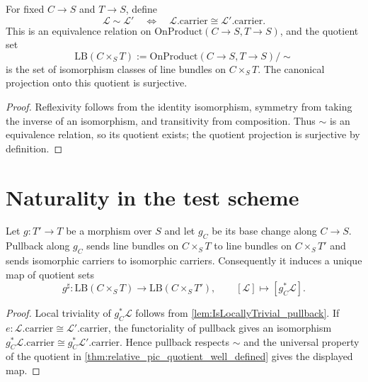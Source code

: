 \begin{theorem}\leanok
  \label{thm:relative_pic_quotient_well_defined}
  For fixed $C\to S$ and $T\to S$, define
  \[
    \mathcal L\sim\mathcal L'
      \quad\Longleftrightarrow\quad
      \mathcal L.\mathrm{carrier}\cong\mathcal L'.\mathrm{carrier}.
  \]
  This is an equivalence relation on
  $\mathrm{OnProduct}(C\to S,T\to S)$, and the quotient set
  \[
    \mathrm{LB}(C\times_S T):=
    \mathrm{OnProduct}(C\to S,T\to S)/\!\sim
  \]
  is the set of isomorphism classes of line bundles on $C\times_S T$.  The
  canonical projection onto this quotient is surjective.
\end{theorem}
\begin{proof}
  \leanok
  Reflexivity follows from the identity isomorphism, symmetry from taking the
  inverse of an isomorphism, and transitivity from composition.  Thus $\sim$ is
  an equivalence relation, so its quotient exists; the quotient projection is
  surjective by definition.
\end{proof}

\section{Naturality in the test scheme}
\label{sec:lbp_pullback_natural}

\begin{theorem}\leanok
  \label{thm:pullback_natural}
  Let $g:T'\to T$ be a morphism over $S$ and let $g_C$ be its base change along
  $C\to S$.  Pullback along $g_C$ sends line bundles on $C\times_S T$ to line
  bundles on $C\times_S T'$ and sends isomorphic carriers to isomorphic
  carriers.  Consequently it induces a unique map of quotient sets
  \[
    g^\sharp:\mathrm{LB}(C\times_S T)\longrightarrow
                    \mathrm{LB}(C\times_S T'),
    \qquad [\mathcal L]\longmapsto[g_C^*\mathcal L].
  \]
\end{theorem}
\begin{proof}
  \leanok
  Local triviality of $g_C^*\mathcal L$ follows from
  \cref{lem:IsLocallyTrivial_pullback}.  If
  $e:\mathcal L.\mathrm{carrier}\cong\mathcal L'.\mathrm{carrier}$, the
  functoriality of pullback gives an isomorphism
  $g_C^*\mathcal L.\mathrm{carrier}\cong g_C^*\mathcal L'.\mathrm{carrier}$.
  Hence pullback respects $\sim$ and the universal property of the quotient in
  \cref{thm:relative_pic_quotient_well_defined} gives the displayed map.
\end{proof}
